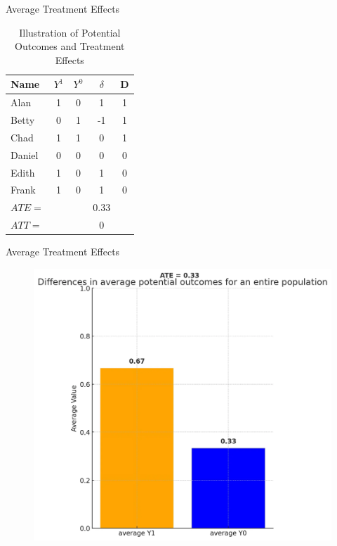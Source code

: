 \documentclass{beamer}
\begin{document}
\begin{frame}{Average Treatment Effects}

\begin{table}[htbp]\centering
\caption{Illustration of Potential Outcomes and Treatment Effects}\label{tab:step1_table}
\begin{tabular}{lccc|c}
\toprule
\textbf{Name} & \textbf{$Y^1$} & \textbf{$Y^0$} & \textbf{$\delta$} & \textbf{D}  \\
\midrule
Alan    & 1 & 0 & 1  & 1  \\
Betty   & 0 & 1 & -1 & 1  \\
Chad    & 1 & 1 & 0  & 1  \\
Daniel  & 0 & 0 & 0  & 0  \\
Edith   & 1 & 0 & 1  & 0  \\
Frank   & 1 & 0 & 1  & 0  \\
\midrule
$ATE =$&&& 0.33 \\
$ATT =$&&&0 \\
\bottomrule
\end{tabular}
\end{table}

\end{frame}

\begin{frame}{Average Treatment Effects}

\begin{figure}
    \centering
    \includegraphics[height=0.8\textheight]{./lecture_includes/step1_y1y0}
\end{figure}


\end{frame}
\end{document}
